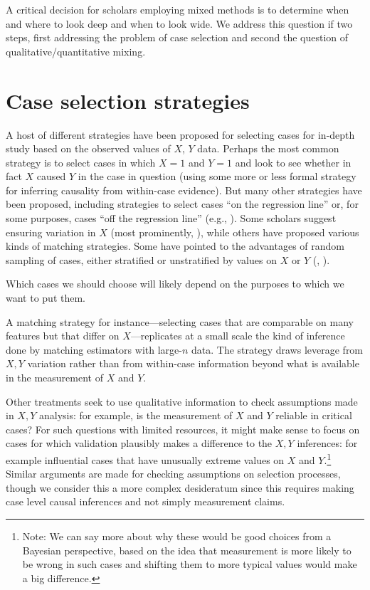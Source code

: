 \documentclass[
  12pt,
]{book}
\begin{document}
A critical decision for scholars employing mixed methods is to determine when and where to look deep and when to look wide. We address this question if two steps, first addressing the problem of case selection and second the question of qualitative/quantitative mixing.

\hypertarget{case-selection-strategies}{%
\section{Case selection strategies}\label{case-selection-strategies}}

A host of different strategies have been proposed for selecting cases for in-depth study based on the observed values of \(X\), \(Y\) data. Perhaps the most common strategy is to select cases in which \(X=1\) and \(Y=1\) and look to see whether in fact \(X\) caused \(Y\) in the case in question (using some more or less formal strategy for inferring causality from within-case evidence). But many other strategies have been proposed, including strategies to select cases ``on the regression line'' or, for some purposes, cases ``off the regression line'' (e.g., \citet{Lieberman2005nested}). Some scholars suggest ensuring variation in \(X\) (most prominently, \citet{king1994designing}), while others have proposed various kinds of matching strategies. Some have pointed to the advantages of random sampling of cases, either stratified or unstratified by values on \(X\) or \(Y\) (\citet{FL2008}, \citet{HerronQuinn}).

Which cases we should choose will likely depend on the purposes to which we want to put them.

A matching strategy for instance---selecting cases that are comparable on many features but that differ on \(X\)---replicates at a small scale the kind of inference done by matching estimators with large-\(n\) data. The strategy draws leverage from \(X,Y\) variation rather than from within-case information beyond what is available in the measurement of \(X\) and \(Y\).

Other treatments seek to use qualitative information to check assumptions made in \(X, Y\) analysis: for example, is the measurement of \(X\) and \(Y\) reliable in critical cases?
For such questions with limited resources, it might make sense to focus on cases for which validation plausibly makes a difference to the \(X,Y\) inferences: for example influential cases that have unusually extreme values on \(X\) and \(Y\).\footnote{Note: We can say more about why these would be good choices from a Bayesian perspective, based on the idea that measurement is more likely to be wrong in such cases and shifting them to more typical values would make a big difference.} Similar arguments are made for checking assumptions on selection processes, though we consider this a more complex desideratum since this requires making case level causal inferences and not simply measurement claims.
\end{document}

